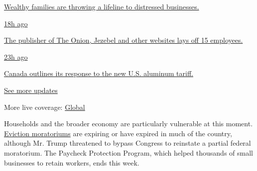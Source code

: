\href{https://www.nytimes.com/live/2020/08/07/business/stock-market-today-coronavirus?action=click\&pgtype=Article\&state=default\&region=MAIN_CONTENT_1\&context=storylines_live_updates\#wealthy-families-are-throwing-a-lifeline-to-distressed-businesses}{Wealthy
families are throwing a lifeline to distressed businesses.}

\href{https://www.nytimes.com/live/2020/08/07/business/stock-market-today-coronavirus?action=click\&pgtype=Article\&state=default\&region=MAIN_CONTENT_1\&context=storylines_live_updates\#the-publisher-of-the-onion-jezebel-and-other-websites-lays-off-15-employees}{18h
ago}

\href{https://www.nytimes.com/live/2020/08/07/business/stock-market-today-coronavirus?action=click\&pgtype=Article\&state=default\&region=MAIN_CONTENT_1\&context=storylines_live_updates\#the-publisher-of-the-onion-jezebel-and-other-websites-lays-off-15-employees}{The
publisher of The Onion, Jezebel and other websites lays off 15
employees.}

\href{https://www.nytimes.com/live/2020/08/07/business/stock-market-today-coronavirus?action=click\&pgtype=Article\&state=default\&region=MAIN_CONTENT_1\&context=storylines_live_updates\#canada-outlines-its-response-to-the-new-us-aluminum-tariff}{23h
ago}

\href{https://www.nytimes.com/live/2020/08/07/business/stock-market-today-coronavirus?action=click\&pgtype=Article\&state=default\&region=MAIN_CONTENT_1\&context=storylines_live_updates\#canada-outlines-its-response-to-the-new-us-aluminum-tariff}{Canada
outlines its response to the new U.S. aluminum tariff.}

\href{https://www.nytimes.com/live/2020/08/07/business/stock-market-today-coronavirus?action=click\&pgtype=Article\&state=default\&region=MAIN_CONTENT_1\&context=storylines_live_updates}{See
more updates}

More live coverage:
\href{https://www.nytimes.com/2020/08/07/world/covid-19-news.html?action=click\&pgtype=Article\&state=default\&region=MAIN_CONTENT_1\&context=storylines_live_updates}{Global}

Households and the broader economy are particularly vulnerable at this
moment.
\href{https://www.nytimes.com/2020/08/07/business/economy/housing-economy-eviction-renters.html}{Eviction
moratoriums} are expiring or have expired in much of the country,
although Mr. Trump threatened to bypass Congress to reinstate a partial
federal moratorium. The Paycheck Protection Program, which helped
thousands of small businesses to retain workers, ends this week.

